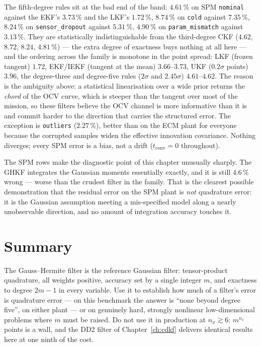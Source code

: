 The fifth-degree rules sit at the bad end of the band: $4.61\,\%$ on SPM \texttt{nominal}
against the EKF's $3.73\,\%$ and the LKF's $1.72\,\%$, $8.74\,\%$ on \texttt{cold} against
$7.35\,\%$, $8.24\,\%$ on \texttt{sensor\_dropout} against $5.31\,\%$, $4.90\,\%$ on
\texttt{param\_mismatch} against $3.13\,\%$. They are statistically indistinguishable from the
third-degree CKF ($4.62$, $8.72$, $8.24$, $4.81\,\%$) --- the extra degree of exactness buys
nothing at all here --- and the ordering across the family is monotone in the point spread:
LKF (frozen tangent) $1.72$, EKF/IEKF (tangent at the mean) $3.66$--$3.73$, UKF
($0.2\sigma$ points) $3.96$, the degree-three and degree-five rules ($2\sigma$ and
$2.45\sigma$) $4.61$--$4.62$. The reason is the ambiguity above: a statistical linearisation
over a wide prior returns the \emph{chord} of the OCV curve, which is steeper than the tangent
over most of the mission, so these filters believe the OCV channel is more informative than it
is and commit harder to the direction that carries the structured error. The exception is
\texttt{outliers} ($2.27\,\%$), better than on the ECM plant for everyone because the corrupted
samples widen the effective innovation covariance. Nothing diverges; every SPM error is a bias,
not a drift ($t_{\text{conv}} = 0$ throughout).

The SPM rows make the diagnostic point of this chapter unusually sharply. The GHKF integrates
the Gaussian moments essentially exactly, and it is still $4.6\,\%$ wrong --- worse than the
crudest filter in the family. That is the clearest possible demonstration that the residual
error on the SPM plant is \emph{not} quadrature error: it is the Gaussian assumption meeting a
mis-specified model along a nearly unobservable direction, and no amount of integration
accuracy touches it.

\section{Summary}
The Gauss--Hermite filter is the reference Gaussian filter: tensor-product quadrature, all
weights positive, accuracy set by a single integer $m$, and exactness to degree $2m-1$ in every
variable. Use it to establish how much of a filter's error is quadrature error --- on this
benchmark the answer is ``none beyond degree five'', on either plant --- or on genuinely hard,
strongly nonlinear low-dimensional problems where $m$ must be raised. Do not use it in
production at $n_x\gtrsim6$: $m^{n_x}$ points is a wall, and the DD2 filter of
Chapter~\ref{ch:cdkf} delivers identical results here at one ninth of the cost.
